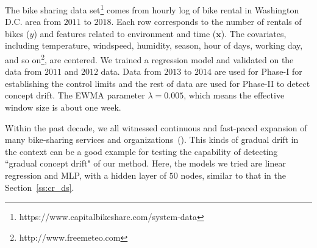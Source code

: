 \documentclass[twoside,11pt]{article}
\begin{document}
\begin{figure}[!htbp]
{%
}
\label{fig:bike_sharing}
\end{figure}

The bike sharing data set\footnote{https://www.capitalbikeshare.com/system-data} comes from hourly log of bike rental in Washington D.C. area from $2011$ to $2018$. Each row corresponds to the number of rentals of bikes ($y$) and features related to environment and time ($\bm {x}$). The covariates, including temperature, windspeed, humidity, season, hour of days, working day, and so on\footnote{http://www.freemeteo.com}, are centered. We trained a regression model and validated on the data from $2011$ and $2012$ data. Data from $2013$ to $2014$ are used for Phase-I for establishing the control limits and the rest of data are used for Phase-II to detect concept drift. The EWMA parameter $ \lambda = 0.005$, which means the effective window size is about one week.

Within the past decade, we all witnessed continuous and fast-paced expansion of many bike-sharing services and organizations~(\cite{shaheen2012public}). This kinds of gradual drift in the context can be a good example for testing the capability of detecting ``gradual concept drift" of our method. Here, the models we tried are linear regression and MLP, with a hidden layer of $50$ nodes, similar to that in the Section~\ref{ss:cr_ds}.
\end{document}
